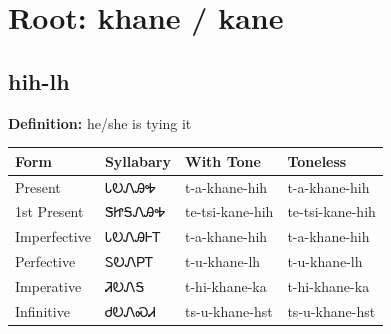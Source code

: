 \documentclass{article}%
\begin{document}
%
\normalsize%
\section*{Root: khane / kane}%
\subsection*{hih-lh}%
\textbf{Definition: }%
he/she is tying it%
\\[0.5em]%
\begin{tabular}{|l|l|l|l|}%
\hline%
\textbf{Form}&\textbf{Syllabary}&\textbf{With Tone}&\textbf{Toneless}\\%
\hline%
Present&ᏓᎧᏁᎯᎭ&t{-}a{-}khane{-}hih&t{-}a{-}khane{-}hih\\%
1st Present&ᏕᏥᎦᏁᎯᎭ&te{-}tsi{-}kane{-}hih&te{-}tsi{-}kane{-}hih\\%
Imperfective&ᏓᎧᏁᎯᎰᎢ&t{-}a{-}khane{-}hih&t{-}a{-}khane{-}hih\\%
Perfective&ᏚᎧᏁᏢᎢ&t{-}u{-}khane{-}lh&t{-}u{-}khane{-}lh\\%
Imperative&ᏘᎧᏁᎦ&t{-}hi{-}khane{-}ka&t{-}hi{-}khane{-}ka\\%
Infinitive&ᏧᎧᏁᏍᏗ&ts{-}u{-}khane{-}hst&ts{-}u{-}khane{-}hst\\%
\hline%
\end{tabular}%
\\[1em]%
\end{document}
